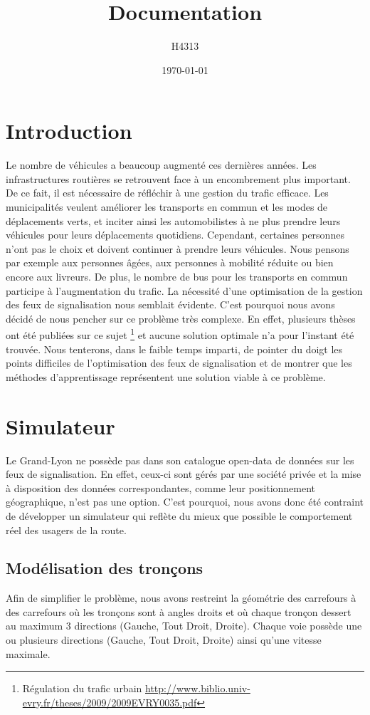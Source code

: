 \documentclass[11pt]{article}
\title{Documentation}
\author{H4313}
\date{\today}
\begin{document}
\maketitle
\tableofcontents
\newpage

\section{Introduction}
Le nombre de véhicules a beaucoup augmenté ces dernières années. Les infrastructures routières se retrouvent face à un encombrement plus important. De ce fait, il est nécessaire de réfléchir à une gestion du trafic efficace. Les municipalités veulent améliorer les transports en commun et les modes de déplacements verts, et inciter ainsi les automobilistes à ne plus prendre leurs véhicules pour leurs déplacements quotidiens. Cependant, certaines personnes n'ont pas le choix et doivent continuer à prendre leurs véhicules. Nous pensons par exemple aux personnes âgées, aux personnes à mobilité réduite ou bien encore aux livreurs. De plus, le nombre de bus pour les transports en commun participe à l'augmentation du trafic. La nécessité d'une optimisation de la gestion des feux de signalisation nous semblait évidente. C'est pourquoi nous avons décidé de nous pencher sur ce problème très complexe. En effet, plusieurs thèses ont été publiées sur ce sujet \footnote{Régulation du trafic urbain \url{http://www.biblio.univ-evry.fr/theses/2009/2009EVRY0035.pdf}} et aucune solution optimale n'a pour l'instant été trouvée. Nous tenterons, dans le faible temps imparti, de pointer du doigt les points difficiles de l'optimisation des feux de signalisation et de montrer que les méthodes d'apprentissage représentent une solution viable à ce problème.

\section{Simulateur}
Le Grand-Lyon ne possède pas dans son catalogue open-data de données sur les feux de signalisation. En effet, ceux-ci sont gérés par une société privée et la mise à disposition des données correspondantes, comme leur positionnement géographique, n'est pas une option. C'est pourquoi, nous avons donc été contraint de développer un simulateur qui reflète du mieux que possible le comportement réel des usagers de la route.

\subsection{Modélisation des tronçons}
Afin de simplifier le problème, nous avons restreint la géométrie des carrefours à des carrefours où les tronçons sont à angles droits et où chaque tronçon dessert au maximum 3 directions (Gauche, Tout Droit, Droite). Chaque voie possède une ou plusieurs directions (Gauche, Tout Droit, Droite) ainsi qu'une vitesse maximale.
\end{document}
